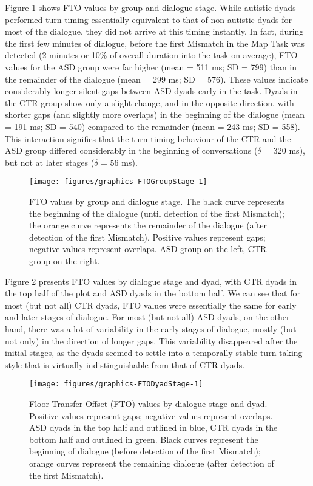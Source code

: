 Figure \ref{fig:FTOGroupStage} shows FTO values by group and dialogue stage. While autistic dyads performed turn-timing essentially equivalent to that of non-autistic dyads for most of the dialogue, they did not arrive at this timing instantly. In fact, during the first few minutes of dialogue, before the first Mismatch in the Map Task was detected (2 minutes or 10\% of overall duration into the task on average), FTO values for the ASD group were far higher (mean = 511 ms; SD = 799) than in the remainder of the dialogue (mean = 299 ms; SD = 576). These values indicate considerably longer silent gaps between ASD dyads early in the task. Dyads in the CTR group show only a slight change, and in the opposite direction, with shorter gaps (and slightly more overlaps) in the beginning of the dialogue (mean = 191 ms; SD = 540) compared to the remainder (mean = 243 ms; SD = 558). This interaction signifies that the turn-timing behaviour of the CTR and the ASD group differed considerably in the beginning of conversations (\(\delta\) = 320 ms), but not at later stages (\(\delta\) = 56 ms).

\begin{figure}

{\centering \texttt{[image: figures/graphics-FTOGroupStage-1]} 

}

\caption{FTO values by group and dialogue stage. The black curve represents the beginning of the dialogue (until detection of the first Mismatch); the orange curve represents the remainder of the dialogue (after detection of the first Mismatch). Positive values represent gaps; negative values represent overlaps. ASD group on the left, CTR group on the right.}\label{fig:FTOGroupStage}
\end{figure}

Figure \ref{fig:FTODyadStage} presents FTO values by dialogue stage and dyad, with CTR dyads in the top half of the plot and ASD dyads in the bottom half. We can see that for most (but not all) CTR dyads, FTO values were essentially the same for early and later stages of dialogue. For most (but not all) ASD dyads, on the other hand, there was a lot of variability in the early stages of dialogue, mostly (but not only) in the direction of longer gaps. This variability disappeared after the initial stages, as the dyads seemed to settle into a temporally stable turn-taking style that is virtually indistinguishable from that of CTR dyads.
\begin{figure}

{\centering \texttt{[image: figures/graphics-FTODyadStage-1]} 
	

\caption{Floor Transfer Offset (FTO) values by dialogue stage and dyad. Positive values represent gaps; negative values represent overlaps. ASD dyads in the top half and outlined in blue, CTR dyads in the bottom half and outlined in green. Black curves represent the beginning of dialogue (before detection of the first Mismatch); orange curves represent the remaining dialogue (after detection of the first Mismatch).}\label{fig:FTODyadStage}
}
\end{figure}


